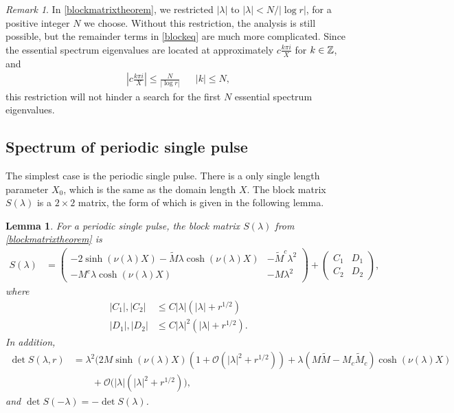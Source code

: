 \documentclass[11pt,reqno]{amsart}
\theoremstyle{plain}
\newtheorem{lemma}[theorem]{Lemma}
\theoremstyle{definition}
\theoremstyle{remark}
\newtheorem{remark}[theorem]{Remark}
\begin{document}
\begin{remark}
In \cref{blockmatrixtheorem}, we restricted $|\lambda|$ to $|\lambda| < N/|\log r|$, for a positive integer $N$ we choose. Without this restriction, the analysis is still possible, but the remainder terms in \cref{blockeq} are much more complicated. Since the essential spectrum eigenvalues are located at approximately $c\frac{k \pi i}{X}$ for $k \in \mathbb{Z}$, and \begin{align*}
\left| c\frac{k \pi i}{X} \right| \leq \frac{N}{|\log r|} && |k|\leq N,
\end{align*} 
this restriction will not hinder a search for the first $N$ essential spectrum eigenvalues.
\end{remark}

\subsection{Spectrum of periodic single pulse}\label{sec:persingle}

The simplest case is the periodic single pulse. There is a only single length parameter $X_0$, which is the same as the domain length $X$. The block matrix $S(\lambda)$ is a $2\times 2$ matrix, the form of which is given in the following lemma.

\begin{lemma}\label{lemma:1blockmatrix}
For a periodic single pulse, the block matrix $S(\lambda)$ from \cref{blockmatrixtheorem} is 
\begin{align}\label{1pblockmatrix}
S(\lambda) &= 
\begin{pmatrix}
-2 \sinh(\nu(\lambda) X) - \tilde{M}\lambda \cosh(\nu(\lambda) X) & -\tilde{M}^c \lambda^2 \\
-M^c \lambda \cosh(\nu(\lambda)X) & - M \lambda^2
\end{pmatrix} +
\begin{pmatrix}
C_1 & D_1 \\ C_2 & D_2
\end{pmatrix},
\end{align}
where
\begin{align*}
|C_1|, |C_2| &\leq C |\lambda|(|\lambda| + r^{1/2}) \\
|D_1|, |D_2| &\leq C |\lambda|^2(|\lambda| + r^{1/2}).
\end{align*}
In addition,
\begin{equation}\label{1pblockmatrixdet}
\begin{aligned}
\det S(\lambda, r) &= \lambda^2 \Big( 2 M \sinh(\nu(\lambda)X)(1 + \mathcal{O}(|\lambda|^2 + r^{1/2})) + \lambda(M \tilde{M} - M_c \tilde{M}_c)\cosh(\nu(\lambda)X) \\
&\qquad+ \mathcal{O}(|\lambda|(|\lambda|^2 + r^{1/2}) \Big),
\end{aligned}
\end{equation}
and $\det S(-\lambda) = -\det S(\lambda)$.
\end{lemma}
\end{document}
